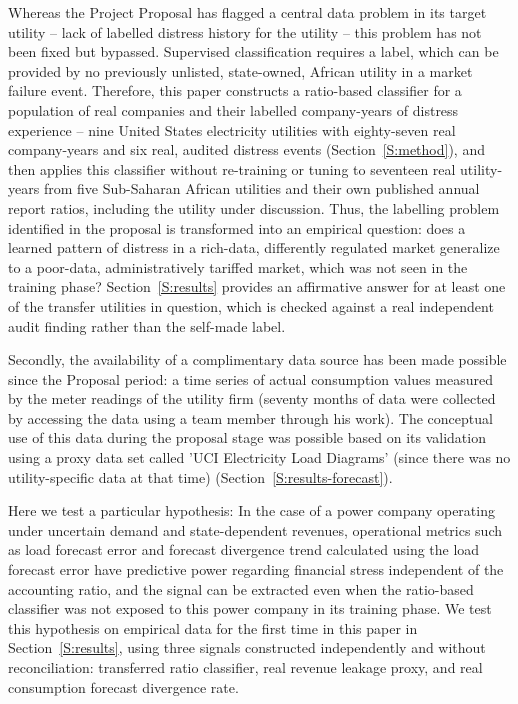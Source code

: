 \documentclass[final,1p,times]{elsarticle}
\begin{document}
Whereas the Project Proposal has flagged a central data problem in its target utility – lack of labelled distress history for the utility – this problem has not been fixed but bypassed. Supervised classification requires a label, which can be provided by no previously unlisted, state-owned, African utility in a market failure event. Therefore, this paper constructs a ratio-based classifier for a population of real companies and their labelled company-years of distress experience -- nine United States electricity utilities with eighty-seven real company-years and six real, audited distress events (Section~\ref{S:method}), and then applies this classifier without re-training or tuning to seventeen real utility-years from five Sub-Saharan African utilities and their own published annual report ratios, including the utility under discussion. Thus, the labelling problem identified in the proposal is transformed into an empirical question: does a learned pattern of distress in a rich-data, differently regulated market generalize to a poor-data, administratively tariffed market, which was not seen in the training phase? Section~\ref{S:results} provides an affirmative answer for at least one of the transfer utilities in question, which is checked against a real independent audit finding rather than the self-made label.

Secondly, the availability of a complimentary data source has been made possible since the Proposal period: a time series of actual consumption values measured by the meter readings of the utility firm (seventy months of data were collected by accessing the data using a team member through his work). The conceptual use of this data during the proposal stage was possible based on its validation using a proxy data set called 'UCI Electricity Load Diagrams' (since there was no utility-specific data at that time) (Section~\ref{S:results-forecast}).

Here we test a particular hypothesis: In the case of a power company operating under uncertain demand and state-dependent revenues, operational metrics such as load forecast error and forecast divergence trend calculated using the load forecast error have predictive power regarding financial stress independent of the accounting ratio, and the signal can be extracted even when the ratio-based classifier was not exposed to this power company in its training phase. We test this hypothesis on empirical data for the first time in this paper in Section~\ref{S:results}, using three signals constructed independently and without reconciliation: transferred ratio classifier, real revenue leakage proxy, and real consumption forecast divergence rate.
\end{document}
